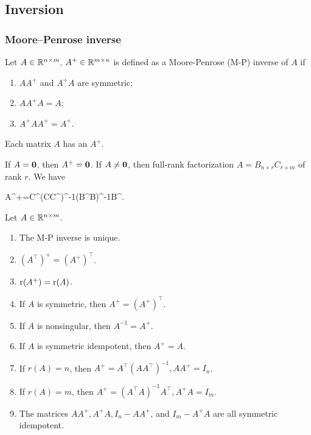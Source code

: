 \documentclass[10pt,a4paper]{book}
\begin{document}
\subsection{Inversion}\label{sec:mat_inv}

\subsubsection{Moore--Penrose inverse}\label{sec:MP_inv}
\begin{defbox}
	\begin{definition}\label{def:MP_inv}
		Let $A\in\mathbb R^{n\times m}$. $A^+\in\mathbb R^{m\times n}$ is defined as a Moore-Penrose (M-P) inverse of $A$ if
		\begin{enumerate}
			\item $A A^+$ and $A^+ A$ are symmetric;
			\item $A A^+ A=A$;
			\item $A^+ A A^+=A^+$.    
		\end{enumerate}   
	\end{definition}
\end{defbox}

\begin{thmbox}
	\begin{theorem}\label{thm:exist_MP_inv}
		Each matrix $A$ has an $A^+$.  
	\end{theorem}
\end{thmbox}
If $A={\boldsymbol 0}$, then $A^+={\boldsymbol 0}$.  
If $A\neq{\boldsymbol 0}$, then full-rank factorization $A=B_{n\times r}C_{r\times m}$ of rank $r$. 
We have 
\begin{sequation*}
	A^+=C^\top(CC^\top)^{-1}(B^\top B)^{-1}B^\top.
\end{sequation*}  

\begin{thmbox}
	\begin{theorem}\label{thm:prop_MP_inv}
		Let $A\in\mathbb R^{n\times m}$. 
		\begin{enumerate}
			\item The M-P inverse is unique.
			\item $(A^{\top})^{+}=(A^{+})^{\top}$.
			\item $\mathrm{r}(A^{+})=\mathrm{r}(A)$.
			\item If $A$ is symmetric, then $A^{+}=(A^{+})^{\top}$.
			\item If $A$ is nonsingular, then $A^{-1}=A^{+}$.
			\item If $A$ is symmetric idempotent, then $A^{+}=A$.
			\item If $r(A)=n$, then $A^{+}=A^{\top}(AA^{\top})^{-1},AA^{+}=I_n$.
			\item If $r(A)=m$, then $A^{+}=(A^{\top}A)^{-1}A^{\top},A^{+}A=I_m$. 
			\item The matrices $AA^{+},A^{+}A,I_n-AA^{+}$, and $I_m-A^{+}A$ are all symmetric idempotent.
		\end{enumerate}
	\end{theorem}
\end{thmbox}
\end{document}
